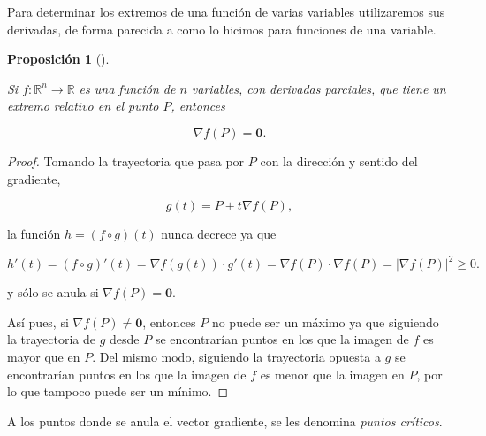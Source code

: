 \documentclass[
  a4paper,
]{scrreport}
\theoremstyle{plain}
\theoremstyle{definition}
\theoremstyle{plain}
\newtheorem{proposition}{Proposición}[chapter]
\theoremstyle{plain}
\theoremstyle{definition}
\theoremstyle{definition}
\theoremstyle{remark}
\begin{document}
Para determinar los extremos de una función de varias variables
utilizaremos sus derivadas, de forma parecida a como lo hicimos para
funciones de una variable.

\begin{proposition}[]\protect\hypertarget{prp-anulacion-gradiente-extremo}{}\label{prp-anulacion-gradiente-extremo}

Si \(f:\mathbb{R}^n\to \mathbb{R}\) es una función de \(n\) variables,
con derivadas parciales, que tiene un extremo relativo en el punto
\(P\), entonces

\[
\nabla f(P) = \mathbf{0}.
\]

\end{proposition}

\begin{tcolorbox}[enhanced jigsaw, titlerule=0mm, arc=.35mm, colframe=quarto-callout-note-color-frame, bottomrule=.15mm, opacitybacktitle=0.6, rightrule=.15mm, coltitle=black, colback=white, toprule=.15mm, title=\textcolor{quarto-callout-note-color}{\faInfo}\hspace{0.5em}{Demostración}, leftrule=.75mm, bottomtitle=1mm, opacityback=0, breakable, colbacktitle=quarto-callout-note-color!10!white, toptitle=1mm, left=2mm]

\begin{proof}
Tomando la trayectoria que pasa por \(P\) con la dirección y sentido del
gradiente,

\[
g(t)=P+t\nabla f(P),
\]

la función \(h=(f\circ g)(t)\) nunca decrece ya que

\[
h'(t)
= (f\circ g)'(t) 
= \nabla f(g(t))\cdot g'(t) 
= \nabla f(P)\cdot \nabla f(P) = 
|\nabla f(P)|^2\geq 0.
\]

y sólo se anula si \(\nabla f(P)= \mathbf{0}\).

Así pues, si \(\nabla f(P)\neq \mathbf{0}\), entonces \(P\) no puede ser
un máximo ya que siguiendo la trayectoria de \(g\) desde \(P\) se
encontrarían puntos en los que la imagen de \(f\) es mayor que en \(P\).
Del mismo modo, siguiendo la trayectoria opuesta a \(g\) se encontrarían
puntos en los que la imagen de \(f\) es menor que la imagen en \(P\),
por lo que tampoco puede ser un mínimo.
\end{proof}

\end{tcolorbox}

A los puntos donde se anula el vector gradiente, se les denomina
\emph{puntos críticos}.
\end{document}

